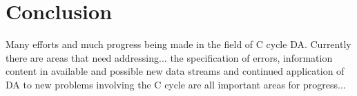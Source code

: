 \documentclass[12pt]{article}
\begin{document}
\section{Conclusion} 

Many efforts and much progress being made in the field of C cycle DA. Currently there are areas that need addressing... the specification of errors, information content in available and possible new data streams and continued application of DA to new problems involving the C cycle are all important areas for progress...







{}
\end{document}

